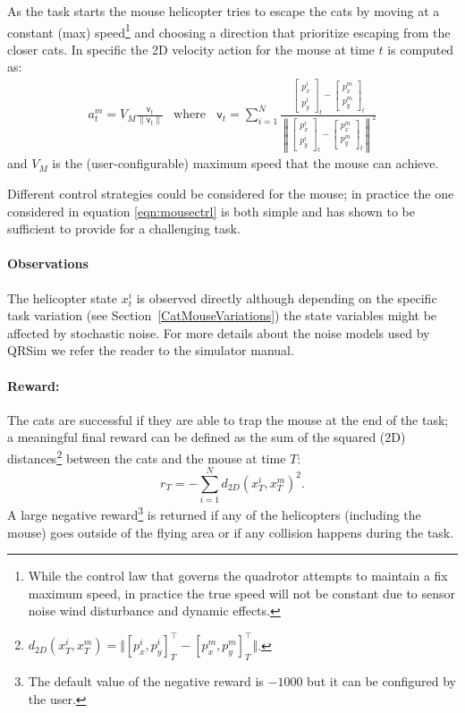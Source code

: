 \documentclass[a4paper,11pt]{report}
\newcommand{\sname}{QRSim\xspace}
\begin{document}
 As the task starts the mouse helicopter tries to escape the cats by moving at a constant (max) speed\footnote{While the control law that governs the quadrotor attempts to maintain a fix maximum speed, in practice the true speed will not be constant due to sensor noise wind disturbance and dynamic effects.} and choosing a direction that prioritize escaping from the closer cats.
In specific the 2D velocity action for the mouse at time $t$ is computed as:
\begin{equation}\label{eqn:mousectrl}
\begin{array}{ll}
a^m_t = V_{M} \frac{\mathsf{v}_t}{\| \mathsf{v}_t \|} &
\text{where } \;\;\mathsf{v}_t = \sum_{i=1}^N \frac{\left[\begin{array}{c} p^i_x \\ p^i_y \end{array}\right]_t - \left[\begin{array}{c} p^m_x \\ p^m_y \end{array}\right]_t}{\left\| \left[\begin{array}{c} p^i_x \\ p^i_y \end{array}\right]_t - \left[\begin{array}{c} p^m_x \\ p^m_y \end{array}\right]_t \right\|^2}
\end{array}
\end{equation}
and $V_{M}$ is the (user-configurable) maximum speed that the mouse can achieve. 

Different control strategies could be considered for the mouse; in practice the one considered in equation \ref{eqn:mousectrl} is both simple and has shown to be sufficient to provide for a challenging task.

\paragraph{Observations}
The helicopter state $x^i_t$ is observed directly although depending on the specific task variation (see Section~\ref{CatMouseVariations}) the state variables might be affected by stochastic noise.
For more details about the noise models used by \sname we refer the reader to the simulator manual. 

\paragraph{Reward:}
The cats are successful if they are able to trap the mouse at the end of the task; a meaningful final reward can be defined as the sum of the squared (2D) distances\footnote{$d_{2D}(x^i_T,x^m_T) = \Vert[p^i_x,p^i_y]_T^\intercal - [p^m_x,p^m_y]_T^\intercal\Vert$.} between the cats and the mouse at time $T$:
$$r_T = - \sum^N_{i=1} d_{2D}(x^i_T,x^m_T)^2.$$
A large negative reward\footnote{The default value of the negative reward is $-1000$ but it can be configured by the user.} is returned if any of the helicopters (including the mouse) goes outside of the flying area or if any collision happens during the task.
\end{document}
